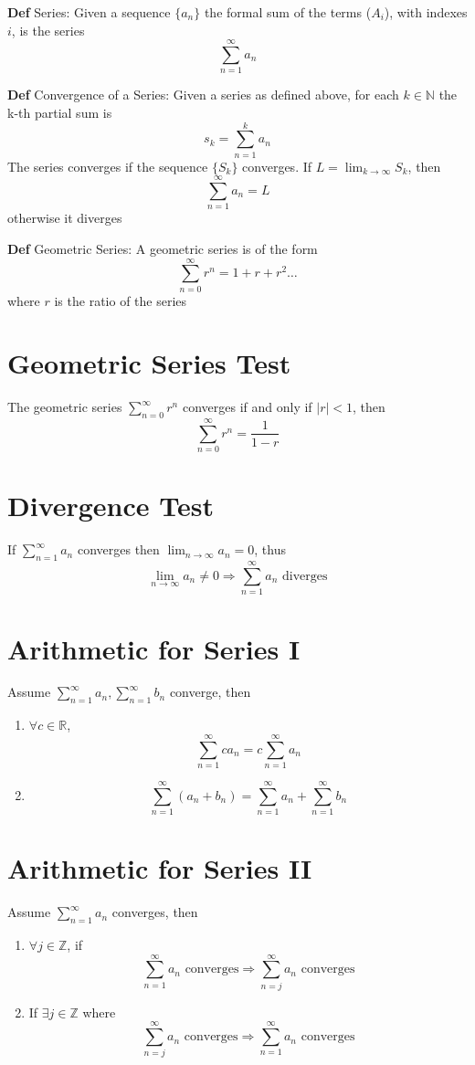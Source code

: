 \documentclass[11pt,notitlepage]{report}
\begin{document}
\textbf{Def} Series: Given a sequence $\{a_n\}$ the formal sum of the terms ($A_i$), with indexes $i$, is the series
$$\sum_{n=1}^\infty a_n$$

\textbf{Def} Convergence of a Series: Given a series as defined above, for each $k \in \mathbb N$ the k-th partial sum is
$$s_k = \sum_{n=1}^k a_n$$
The series converges if the sequence $\{S_k\}$ converges. If $L = \lim_{k \to \infty}S_k$, then
$$\sum_{n=1}^\infty a_n = L$$otherwise it diverges

\textbf{Def} Geometric Series: A geometric series is of the form
$$\sum_{n=0}^\infty r^n = 1 + r + r^2 \dots $$
where $r$ is the ratio of the series



\section{Geometric Series Test}The geometric series $\sum_{n=0}^\infty r^n$ converges if and only if $|r| < 1$, then
$$\sum_{n=0}^\infty r^n = \frac{1}{1-r}$$

\section{Divergence Test}If $\sum_{n=1}^\infty a_n$ converges then $\lim_{n \to \infty} a_n = 0$, thus
$$\lim_{n \to \infty} a_n \ne 0 \Longrightarrow \sum_{n=1}^\infty a_n \text{ diverges}$$

\section{Arithmetic for Series I}Assume $\sum_{n=1}^\infty a_n, \sum_{n=1}^\infty b_n$ converge, then
\begin{enumerate}
    \item $\forall c \in \mathbb R$, $$\sum_{n=1}^\infty c a_n = c\sum_{n=1}^\infty a_n$$
    \item $$\sum_{n=1}^\infty (a_n+b_n) = \sum_{n=1}^\infty a_n + \sum_{n=1}^\infty b_n$$
\end{enumerate}

\section{Arithmetic for Series II}Assume $\sum_{n=1}^\infty a_n$ converges, then
\begin{enumerate}
    \item $\forall j \in \mathbb Z$, if $$\sum_{n=1}^\infty a_n \text{ converges} \Longrightarrow  \sum_{n=j}^\infty a_n \text{ converges}$$
    \item If $\exists j \in \mathbb Z$ where $$\sum_{n=j}^\infty a_n \text{ converges} \Longrightarrow  \sum_{n=1}^\infty a_n \text{ converges}$$
\end{enumerate}
\end{document}
